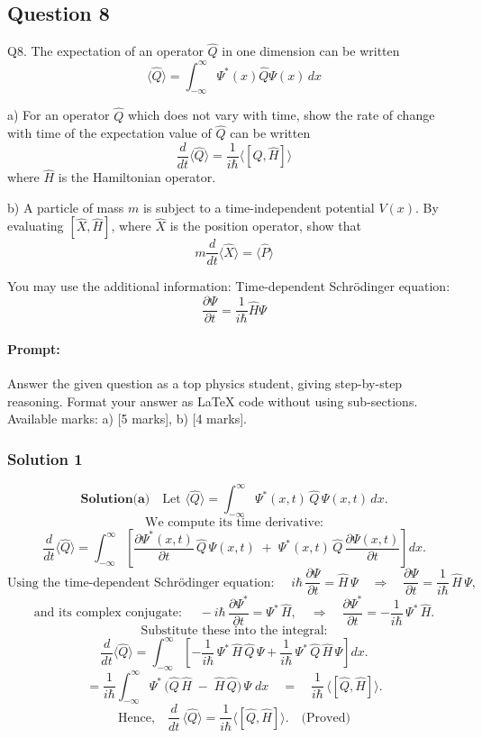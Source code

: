 \documentclass{article}
\begin{document}
\subsection{Question 8}
Q8.  
The expectation of an operator $\hat{Q}$ in one dimension can be written  
\[
\langle \hat{Q} \rangle = \int_{-\infty}^{\infty} \Psi^*(x) \hat{Q} \Psi(x) \, dx
\]

a) For an operator $\hat{Q}$ which does not vary with time, show the rate of change with time of the expectation value of $\hat{Q}$ can be written  
\[
\frac{d}{dt} \langle \hat{Q} \rangle = \frac{1}{i\hbar} \langle [\hat{Q}, \hat{H}] \rangle
\]  
where $\hat{H}$ is the Hamiltonian operator.

b) A particle of mass $m$ is subject to a time-independent potential $V(x)$. By evaluating $[\hat{X}, \hat{H}]$, where $\hat{X}$ is the position operator, show that  
\[
m \frac{d}{dt} \langle \hat{X} \rangle = \langle \hat{P} \rangle
\]

You may use the additional information:  
Time-dependent Schrödinger equation:  
\[
\frac{\partial \Psi}{\partial t} = \frac{1}{i\hbar} \hat{H} \Psi
\]


\paragraph{Prompt: \\} 
Answer the given question as a top physics student, giving step-by-step reasoning. Format your answer as LaTeX code without using sub-sections. Available marks: a) [5 marks], b) [4 marks].


\subsubsection{Solution 1}
\[
\textbf{Solution}

\textbf{(a)} \quad
\text{Let } \langle \hat{Q} \rangle = \int_{-\infty}^{\infty} \Psi^*(x,t)\,\hat{Q}\,\Psi(x,t)\,dx.
\]
\[
\text{We compute its time derivative:}
\]
\[
\frac{d}{dt}\langle \hat{Q} \rangle
=
\int_{-\infty}^{\infty}
\left[
\frac{\partial \Psi^*(x,t)}{\partial t}\,\hat{Q}\,\Psi(x,t)
\;+\;
\Psi^*(x,t)\,\hat{Q}\,\frac{\partial \Psi(x,t)}{\partial t}
\right] dx.
\]
\[
\text{Using the time-dependent Schr\"odinger equation: } 
\quad
i\hbar\,\frac{\partial \Psi}{\partial t} = \hat{H}\,\Psi
\quad
\Longrightarrow
\quad
\frac{\partial \Psi}{\partial t} = \frac{1}{i\hbar}\,\hat{H}\,\Psi,
\]
\[
\text{and its complex conjugate: } 
\quad
-i\hbar \,\frac{\partial \Psi^*}{\partial t}
=
\Psi^*\,\hat{H},
\quad
\Longrightarrow
\quad
\frac{\partial \Psi^*}{\partial t} = -\frac{1}{i\hbar}\,\Psi^*\,\hat{H}.
\]
\[
\text{Substitute these into the integral:}
\]
\[
\frac{d}{dt}\langle \hat{Q} \rangle
=
\int_{-\infty}^{\infty}
\left[
-\frac{1}{i\hbar}\,\Psi^*\,\hat{H}\,\hat{Q}\,\Psi
+
\frac{1}{i\hbar}\,\Psi^*\,\hat{Q}\,\hat{H}\,\Psi
\right]dx.
\]
\[
=
\frac{1}{i\hbar}
\int_{-\infty}^{\infty}
\Psi^*\,\Big(\hat{Q}\,\hat{H}\;-\;\hat{H}\,\hat{Q}\Big)\,\Psi\;dx
\quad=\quad
\frac{1}{i\hbar}\,
\Big\langle 
[\hat{Q},\hat{H}]
\Big\rangle.
\]
\[
\text{Hence,}
\quad
\frac{d}{dt}\,\langle \hat{Q} \rangle
=
\frac{1}{i\hbar}
\langle
[\hat{Q}, \hat{H}]
\rangle.
\quad
\text{(Proved)}
\]
\end{document}
